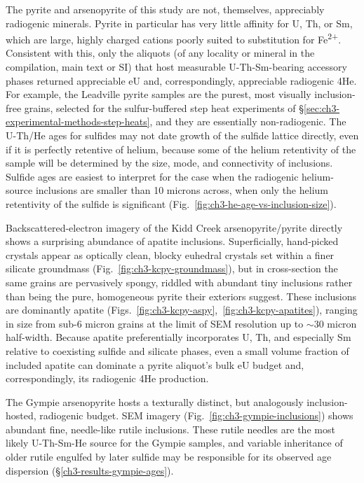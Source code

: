 The pyrite and arsenopyrite of this study are not, themselves,
appreciably radiogenic minerals. Pyrite in particular has very little affinity for U, Th, or Sm, which are large, highly charged
cations poorly suited to substitution for Fe\textsuperscript{2+}. Consistent with this, only the
aliquots (of any locality or mineral in the compilation, main text or
SI) that host measurable U-Th-Sm-bearing accessory phases returned
appreciable eU and, correspondingly, appreciable radiogenic 4He. For example, 
the Leadville pyrite samples are the purest, most visually inclusion-free grains, selected for the sulfur-buffered step heat experiments of \S\ref{sec:ch3-experimental-methods-step-heats}, and they
are essentially non-radiogenic. The U-Th/He ages for sulfides may not date growth of the sulfide
lattice directly, even if it is perfectly retentive of helium, because some of the 
helium retentivity of the sample will be determined by the size, mode, and connectivity of inclusions. 
Sulfide ages are easiest to interpret for the case when the radiogenic helium-source inclusions 
are smaller than 10 microns across, when only the helium retentivity of the sulfide is significant (Fig.~\ref{fig:ch3-he-age-vs-inclusion-size}). 

Backscattered-electron imagery of the Kidd Creek arsenopyrite/pyrite directly shows a surprising abundance of apatite inclusions. Superficially, hand-picked crystals appear as optically clean, blocky euhedral 
crystals set within a finer
silicate groundmass (Fig.~\ref{fig:ch3-kcpy-groundmass}), but in
cross-section the same grains are pervasively spongy, riddled with
abundant tiny inclusions rather than being the pure, homogeneous pyrite
their exteriors suggest. These inclusions are dominantly apatite
(Figs.~\ref{fig:ch3-kcpy-aspy},~\ref{fig:ch3-kcpy-apatites}), ranging in
size from sub-6 micron grains at the limit of SEM resolution up to
$\sim$30 micron half-width. Because apatite
preferentially incorporates U, Th, and especially Sm relative to
coexisting sulfide and silicate phases, even a small volume fraction of
included apatite can dominate a pyrite aliquot's bulk eU budget and,
correspondingly, its radiogenic 4He production.

The Gympie arsenopyrite hosts a texturally distinct, but analogously
inclusion-hosted, radiogenic budget. SEM imagery
(Fig.~\ref{fig:ch3-gympie-inclusions}) shows abundant fine, needle-like
rutile inclusions. These rutile needles are the most likely U-Th-Sm-He source for the Gympie samples,
and variable inheritance of older rutile engulfed by later sulfide may be responsible for 
its observed age dispersion (\S\ref{ch3-results-gympie-ages}). 


